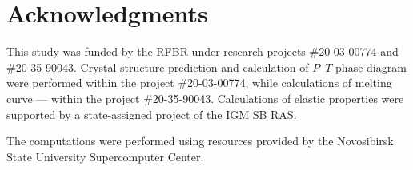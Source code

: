 \documentclass[a4paperm]{article}
\begin{document}
\section*{Acknowledgments}
This study was funded by the RFBR under research projects \#20-03-00774 and \#20-35-90043.
Crystal structure prediction and calculation of $P$--$T$ phase diagram were performed within the project \#20-03-00774, while calculations of melting curve --- within the project \#20-35-90043.
Calculations of elastic properties were supported by a state-assigned project of the IGM SB RAS. 

The computations were performed using resources provided by the Novosibirsk State University Supercomputer Center.




\end{document}
